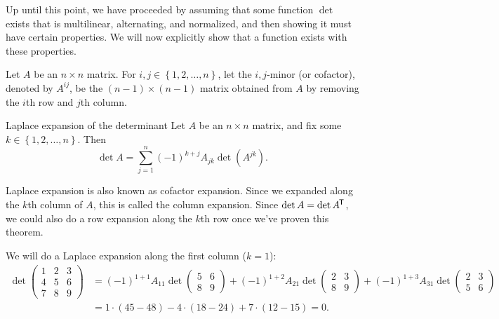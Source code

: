 \begin{rmk}
    Up until this point, we have proceeded by assuming that some function $\det$ exists that is multilinear, alternating, and normalized, and then showing it must have certain properties. We will now explicitly show that a function exists with these properties.
\end{rmk}

\begin{defn}
    Let $A$ be an $n \times n$ matrix. For $i, j \in \left\{1, 2, \ldots, n\right\}$, let the $i,j$-minor (or cofactor), denoted by $A^{ij}$, be the $(n-1) \times (n-1)$ matrix obtained from $A$ by removing the $i$th row and $j$th column.
\end{defn}

\begin{thm}Laplace expansion of the determinant\proofbreak
    Let $A$ be an $n \times n$ matrix, and fix some $k \in \left\{1, 2, \ldots, n\right\}$. Then
    \[\det A = \sum_{j=1}^{n}(-1)^{k+j}A_{jk}\det(A^{jk}).\]
\end{thm}

\begin{rmk}
    Laplace expansion is also known as cofactor expansion. Since we expanded along the $k$th column of $A$, this is called the column expansion. Since $\det A = \det{A}^{\mkern-1.5mu\mathsf{T}}$, we could also do a row expansion along the $k$th row once we've proven this theorem.
\end{rmk}

\begin{exmp}
    We will do a Laplace expansion along the first column ($k=1$):
    \begin{align*}
        \det \begin{pmatrix}
            1 &2 &3 \\
            4 &5 &6 \\
            7 &8 &9
        \end{pmatrix}
        &= (-1)^{1+1}A_{11}\det \begin{pmatrix}
            5 & 6 \\ 8 & 9
        \end{pmatrix} + (-1)^{1+2}A_{21}\det \begin{pmatrix}
            2 & 3 \\ 8 & 9
        \end{pmatrix} + (-1)^{1+3}A_{31}\det \begin{pmatrix}
            2 & 3 \\ 5 & 6
        \end{pmatrix} \\
        &= 1\cdot(45 - 48) - 4\cdot(18 - 24) + 7\cdot(12 - 15) = 0.
    \end{align*}
\end{exmp}

